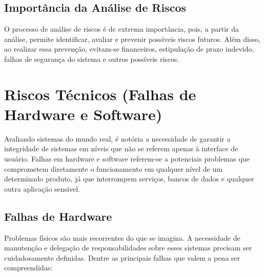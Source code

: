 \documentclass[12pt,oneside,a4paper,article]{abntex2}
\begin{document}
\subsection {Importância da Análise de Riscos}
{O processo de análise de riscos é de extrema importância, pois, a partir da análise, permite identificar, avaliar e prevenir possíveis riscos futuros. Além disso, ao realizar essa prevenção, evitam-se financeiros, estipulação de prazo indevido, falhas de segurança do sistema e outros possíveis riscos.}

\newpage

\setcounter{section}{0}
\section{Riscos Técnicos (Falhas de Hardware e Software)}

Avaliando sistemas do mundo real, é notória a necessidade de garantir a integridade de sistemas em níveis que não se referem apenas à interface de usuário. Falhas em hardware e software referem-se a potenciais problemas que comprometem diretamente o funcionamento em qualquer nível de um determinado produto, já que interrompem serviços, bancos de dados e qualquer outra aplicação sensível.

\subsection{Falhas de Hardware}

Problemas físicos são mais recorrentes do que se imagina. A necessidade de manutenção e delegação de responsabilidades sobre esses sistemas precisam ser cuidadosamente definidas. Dentre as principais falhas que valem a pena ser compreendidas:
\end{document}

